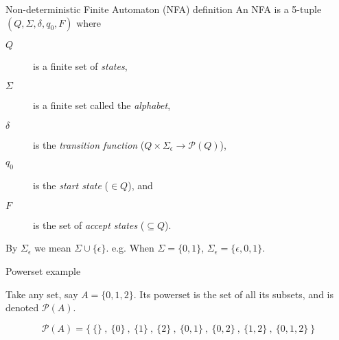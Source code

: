 \begin{frame}[fragile]{Non-deterministic Finite Automaton (NFA) definition}
  An NFA is a 5-tuple \( (Q,\Sigma,\delta,q_0,F) \) where
  \begin{description}
    \item[\( Q \)] is a finite set of \emph{states},
    \item[\( \Sigma \)] is a finite set called the \emph{alphabet},
    \item[\( \delta \)] is the \emph{transition function} (\( Q \times \Sigma_{\epsilon} \rightarrow \mathcal{P}(Q) \)),
    \item[\( q_0 \)] is the \emph{start state} (\( \in Q \)), and
    \item[\( F \)] is the set of \emph{accept states} (\( \subseteq Q \)). 
  \end{description}
  \vspace{5mm}
  By \( \Sigma_{\epsilon} \) we mean \( \Sigma \cup \{ \epsilon \} \).
  e.g. When \( \Sigma = \{0,1\} \), \( \Sigma_{\epsilon} = \{\epsilon,0,1\}. \)
\end{frame}

\begin{frame}[fragile]{Powerset example}

  Take any set, say \( A = \{0,1,2\} \).
  Its powerset is the set of all its subsets, and is denoted \( \mathcal{P}(A) \).


  \[
  \mathcal{P}(A) = \Big\{ \ 
                      \{ \} \  , \  \{ 0 \} \  , \  \{ 1 \} \  ,\   \{ 2 \} \  , \ 
                      \{ 0,1 \} \  , \  \{ 0,2 \} \  , \  \{ 1,2 \} \  , \ 
                      \{ 0,1,2 \} \ 
                    \Big\}
  \]

\end{frame}

\vspace{2mm}

